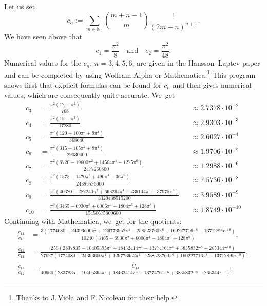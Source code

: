 \documentclass[11pt]{article}
\newcommand{\smaller}{\small}
\theoremstyle{definition}
\newcommand{\1}{\mathbbm{1}}
\newcommand{\N}{\mathbb{N}}
\numberwithin{equation}{section}
\begin{document}
Let us set
\begin{equation}\label{eq:defcn}
c_n := \sum_{m\in\N_0} \binom{m+n-1}{m} \frac{1}{(2m+n)^{n+1}}.
\end{equation}
We have seen above that
\[
c_1=\frac{\pi^2}8 \quad \text{and}\quad
c_2 = \frac{\pi^2}{48}.
\]
Numerical values for the $c_n$, $n=3,4,5,6$, are given in the Hansson--Laptev paper \cite{HL} and can be completed by using Wolfram Alpha or Mathematica.\footnote{Thanks to J.\,Viola and F.\,Nicoleau for their help.}
This program shows first that explicit formulas can be found for $c_n$ and then gives numerical values, which are consequently quite accurate. We~get
{\smaller\smaller
\[
\begin{aligned}
c_3 & = \frac{\pi^2(12-\pi^2)}{768} &&\approx 2.7378\cdot10^{-2}\\
c_4 & = \frac{\pi^2 (15-\pi^2)}{17280}&&\approx 2.9303 \cdot  10^{-3}\\
c_5& = \frac{\pi^2 (120-100\pi^2 + 9 \pi^4)}{368640}&&\approx 2.6027\cdot  10^{-4}\\
c_6&= \frac{\pi^2(315-105 \pi^2+ 8 \pi^4)}{29030400}&&\approx 1.9706 \cdot  10^{-5}\\
c_7&=\frac{\pi^2 (6720 - 19600 \pi^2 + 14504 \pi^4 - 1275 \pi^6)}{2477260800}&&\approx 1.2988\cdot 10^{-6}\\
c_8 &= \frac{\pi^2 (1575 - 1470 \pi^2 + 490 \pi ^4 - 36 \pi ^6)}{24385536000}&&\approx 7.5736\cdot10^{-8}\\
c_9&=\frac{\pi^2(40 320 - 282 240 \pi^2 + 663 264 \pi^4 - 439 144 \pi^6 + 37975 \pi^8)}{3329438515200}&&\approx 3.9589\cdot  10^{-9}\\
c_{10}&= \frac{\pi^2 (3465 - 6930 \pi^2 + 6006 \pi ^4 - 1804 \pi^6 + 128 \pi ^8)}{15450675609600}&&\approx1.8749\cdot10^{-10}
\end{aligned}
\]
}%
Continuing with Mathematica, we~get for the quotients:
{\smaller\smaller
\begin{align*}
\frac{c_{11}}{c_{10}} & = \frac{3 \left(1774080 - 24393600 \pi ^2 + 129773952 \pi ^4 - 258523760 \pi ^6 + 160227716 \pi ^8 - 13712895 \pi ^{10}\right)}{10240
\left(3465-6930 \pi ^2+6006 \pi ^4-1804 \pi ^6+128 \pi ^8\right)}, \\
\frac{c_{12}}{c_{11}} & = \frac{256 \left(2837835-10405395 \pi ^2 + 18432414 \pi ^4 - 13774761 \pi ^6 + 3835832 \pi ^8 - 265344 \pi ^{10}\right)}{27027
(1774080 \!-\! 24393600 \pi ^2 \!+\! 129773952 \pi ^4 \!-\! 258523760 \pi ^6 \!+\! 160227716 \pi ^8 \!-\! 13712895 \pi ^{10})},\\
\frac{c_{13}}{c_{12}} & = \frac{\hat C_{13}}{40960 \left(2837835 - 10405395 \pi ^2 + 18432414 \pi ^4 - 13774761 \pi ^6 + 3835832 \pi ^8 - 265344 \pi ^{10}\right)},
\end{align*}
}%
\end{document}
